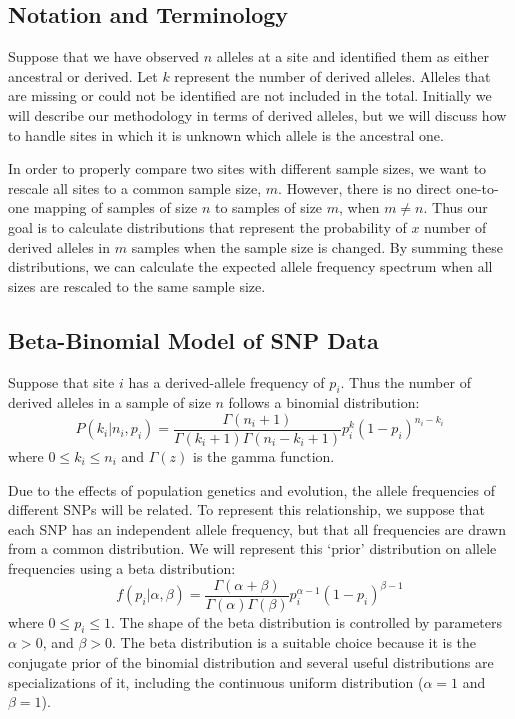 \documentclass[11pt,letterpaper]{article}
\begin{document}
\subsection{Notation and Terminology}

Suppose that we have observed $n$ alleles at a site and identified them as either ancestral or derived.   Let $k$ represent the number of derived alleles.  Alleles that are missing or could not be identified are not included in the total.  Initially we will describe our methodology in terms of derived alleles, but we will discuss how to handle sites in which it is unknown which allele is the ancestral one.


In order to properly compare two sites with different sample sizes, we want to rescale all sites to a common sample size, $m$.  However, there is no direct one-to-one mapping of samples of size $n$ to samples of size $m$, when $m \ne n$.  Thus our goal is to calculate distributions that represent the probability of $x$ number of derived alleles in $m$ samples when the sample size is changed.  By summing these distributions, we can calculate the expected allele frequency spectrum when all sizes are rescaled to the same sample size.

\subsection{Beta-Binomial Model of SNP Data}

Suppose that site $i$ has a derived-allele frequency of $p_i$.  Thus the number of derived alleles in a sample of size $n$ follows a binomial distribution:
\[
P(k_i|n_i,p_i) = \frac{\Gamma(n_i+1)}{\Gamma(k_i+1) \Gamma(n_i-k_i+1)}%
p_i^k (1-p_i)^{n_i-k_i}
\]
where $0 \le k_i \le n_i$ and $\Gamma(z)$ is the gamma function.  


Due to the effects of population genetics and evolution, the allele frequencies of different SNPs will be related.  To represent this relationship, we suppose that each SNP has an independent allele frequency, but that all frequencies are drawn from a common distribution.  We will represent this `prior' distribution on allele frequencies using a beta distribution:
\[
f(p_i|\alpha,\beta) = \frac{\Gamma(\alpha+\beta)}{\Gamma(\alpha)\Gamma(\beta)}%
p_i^{\alpha-1}(1-p_i)^{\beta-1}
\]
where $0 \le p_i \le 1$.  The shape of the beta distribution is controlled by parameters $\alpha > 0$, and $\beta > 0$.  The beta distribution is a suitable choice because it is the conjugate prior of the binomial distribution and several useful distributions are specializations of it, including the continuous uniform distribution ($\alpha=1$ and $\beta=1$). 
\end{document}
